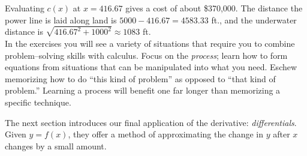 {Evaluating $c(x)$ at $x=416.67$ gives a cost of about \$370,000. The distance the power line is laid along land is $5000-416.67 = 4583.33$ ft., and the underwater distance is $\sqrt{416.67^2+1000^2} \approx 1083$ ft.
}\\

In the exercises you will see a variety of situations that require you to combine problem--solving skills with calculus. Focus on the \textit{process}; learn how to form equations from situations that can be manipulated into what you need. Eschew memorizing how to do ``this kind of problem'' as opposed to ``that kind of problem.'' Learning a process will benefit one far longer than memorizing a specific technique.

The next section introduces our final application of the derivative: \textit{differentials}. Given $y=f(x)$, they offer a method of approximating the change in $y$ after $x$ changes by a small amount. 

		
